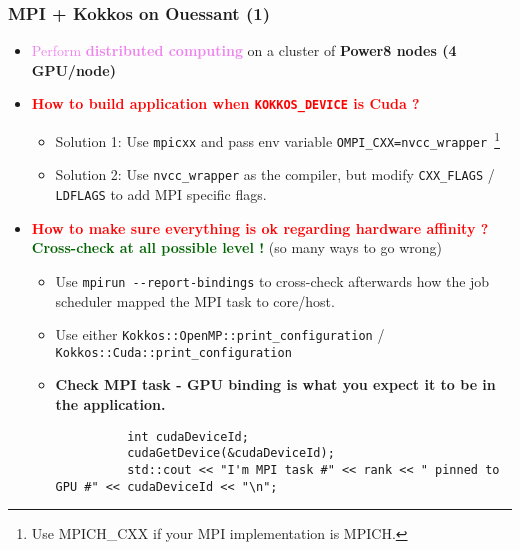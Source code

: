 \begin{frame}[fragile=singleslide]
  \frametitle{MPI + Kokkos on Ouessant (1)}

  \begin{itemize}
  \item \textcolor{violet}{Perform \textbf{distributed computing}} on a cluster of \textbf{Power8 nodes (4 GPU/node)}
  \item \textcolor{red}{\bf How to build application when \texttt{KOKKOS\_DEVICE} is Cuda ?}
    \begin{itemize}
    \item Solution 1: Use \texttt{mpicxx} and pass env variable \texttt{OMPI\_CXX=nvcc\_wrapper}~\footnote{Use MPICH\_CXX if your MPI implementation is MPICH.}
    \item Solution 2: Use \texttt{nvcc\_wrapper} as the compiler, but modify \texttt{CXX\_FLAGS} / \texttt{LDFLAGS} to add MPI specific flags.
    \end{itemize}
  \item \textcolor{red}{\bf How to make sure everything is ok regarding hardware affinity ? }
    \textcolor{darkgreen}{\textbf{Cross-check at all possible level !}} (so many ways to go wrong)
    \begin{itemize}
    \item Use \texttt{mpirun \--\--report-bindings} to cross-check afterwards how the job scheduler mapped the MPI task to core/host.
    \item Use either \texttt{Kokkos::OpenMP::print\_configuration} / \texttt{Kokkos::Cuda::print\_configuration}
    \item {\bf Check MPI task - GPU binding is what you expect it to be in the application.}
      {\scriptsize
        \begin{verbatim}
          int cudaDeviceId;
          cudaGetDevice(&cudaDeviceId);
          std::cout << "I'm MPI task #" << rank << " pinned to GPU #" << cudaDeviceId << "\n";
        \end{verbatim}
      }
    \end{itemize} 
  \end{itemize}

\end{frame}

